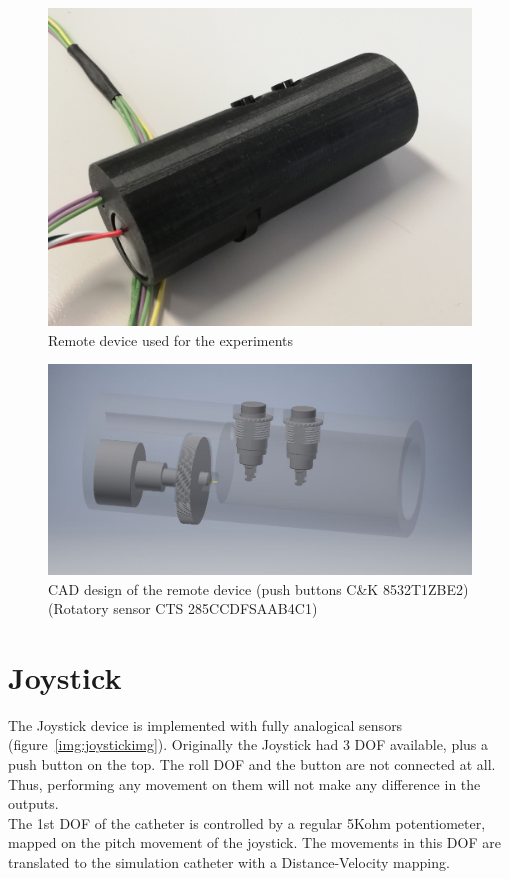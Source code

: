 \begin{figure}[ht]
   \centering
   \includegraphics[width=0.7\linewidth]{img/remote.jpg}
   \caption{Remote device used for the experiments}
   \label{img:remotenorm}
\end{figure}

\begin{figure}[ht]
   \centering
   \includegraphics[width=0.7\linewidth]{img/remotecad.jpg}
   \caption{CAD design of the remote device (push buttons C\&K 8532T1ZBE2) (Rotatory sensor CTS 285CCDFSAAB4C1)}
   \label{img:remotecad}
\end{figure}

\section{Joystick}\label{sec:joystick}

The Joystick device is implemented with fully analogical sensors (figure~\ref{img:joystickimg}). Originally the Joystick had 3 DOF available, plus a push button on the top. The roll DOF and the button are not connected at all. Thus, performing any movement on them will not make any difference in the outputs.\\

The 1st DOF of the catheter is controlled by a regular 5Kohm potentiometer, mapped on the pitch movement of the joystick. The movements in this DOF are translated to the simulation catheter with a Distance-Velocity mapping.\\


